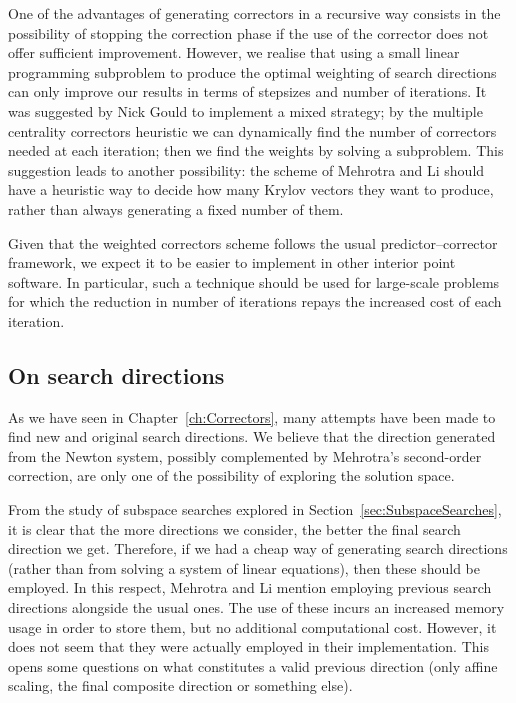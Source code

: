 One of the advantages of generating correctors in a recursive way
consists in the possibility of stopping the correction phase
if the use of the corrector does not offer sufficient improvement.
However, we realise that using a small linear programming subproblem
to produce the optimal weighting of search directions can only improve
our results in terms of stepsizes and number of iterations.
It was suggested by Nick Gould to implement a mixed strategy;
by the multiple centrality correctors heuristic we can dynamically
find the number of correctors needed at each iteration; then we find
the weights by solving a subproblem.
This suggestion leads to another possibility: the scheme of
Mehrotra and Li should have a heuristic way to decide how many
Krylov vectors they want to produce, rather than always generating
a fixed number of them.

Given that the weighted correctors scheme follows the usual 
predictor--corrector framework,
we expect it to be easier to implement in other interior point software.
In particular, such a technique should be used for large-scale problems
for which the reduction in number of iterations repays the
increased cost of each iteration. 

%
%
\subsection*{On search directions}

As we have seen in Chapter~\ref{ch:Correctors}, many attempts
have been made to find new and original search directions.
We believe that the direction generated from the Newton system,
possibly complemented by Mehrotra's second-order correction,
are only one of the possibility of exploring the solution space.

From the study of subspace searches explored in
Section~\ref{sec:SubspaceSearches}, it is clear that the more 
directions we consider, the better the final search direction 
we get. Therefore, if we had a cheap way of generating search
directions (rather than from solving a system of linear equations),
then these should be employed.
In this respect, Mehrotra and Li \cite{MehrotraLi} 
mention employing previous search directions alongside the usual ones. 
The use of these incurs an increased memory usage 
in order to store them, but no additional computational cost.
However, it does not seem that they were actually employed in
their implementation.
This opens some questions on what constitutes a valid
previous direction (only affine scaling, the final composite direction
or something else).

